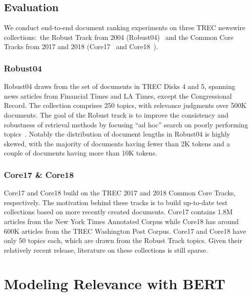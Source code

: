\subsection{Evaluation}

We conduct end-to-end document ranking experiments on three TREC newswire collections:\ the Robust Track from 2004 (Robust04)~\cite{Voorhees_TREC2004_robust} and the Common Core Tracks from 2017 and 2018 (Core17~\cite{allan2017trec} and Core18~\cite{core2018trec}).

\subsubsection{Robust04}

Robust04 draws from the set of documents in TREC Disks 4 and 5, spanning news articles from Financial Times and LA Times, except the Congressional Record.
The collection comprises 250 topics, with relevance judgments over 500K documents.
The goal of the Robust track is to improve the consistency and robustness of retrieval methods by focusing ``ad hoc'' search on poorly performing topics~\cite{Voorhees_TREC2004_robust}.
Notably the distribution of document lengths in Robust04 is highly skewed, with the majority of documents having fewer than 2K tokens and a couple of documents having more than 10K tokens.

\subsubsection{Core17 \& Core18}

Core17 and Core18 build on the TREC 2017 and 2018 Common Core Tracks, respectively.
The motivation behind these tracks is to build up-to-date test collections based on more recently created documents.
Core17 contains 1.8M articles from the New York Times Annotated Corpus while Core18 has around 600K articles from the TREC Washington Post Corpus.
Core17 and Core18 have only 50 topics each, which are drawn from the Robust Track topics.
Given their relatively recent release, literature on these collections is still sparse.

\section{Modeling Relevance with BERT}

